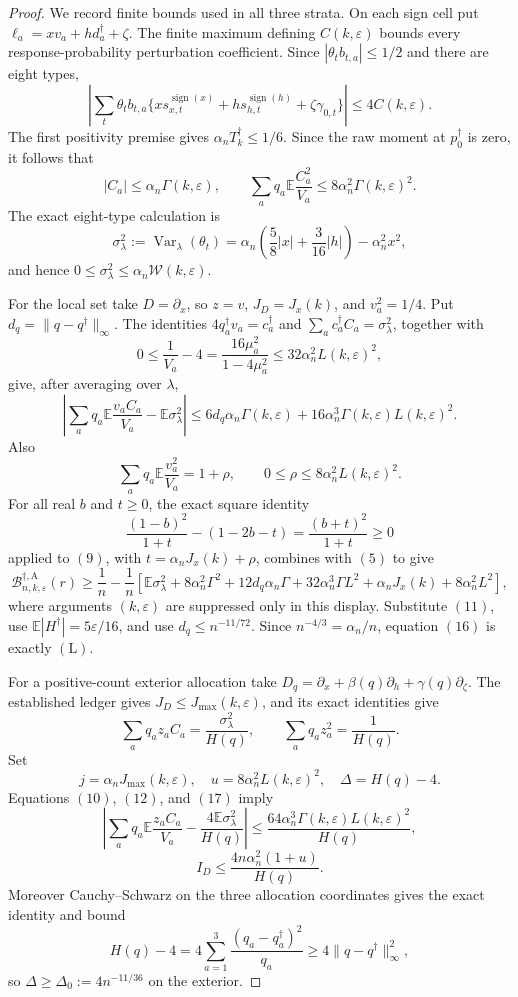 \documentclass{article}
\begin{document}
{\begin{proof}
We record finite bounds used in all three strata.  On each sign cell put
\(\ell_a=xv_a+hd_a^\dagger+\zeta\).  The finite maximum defining
\(C(k,\varepsilon)\) bounds every response-probability perturbation coefficient.  Since \(|\theta_tb_{t,a}|\le1/2\) and there are eight types,
\[
\left|\sum_t\theta_tb_{t,a}
\{xs_{x,t}^{\operatorname{sign}(x)}
+hs_{h,t}^{\operatorname{sign}(h)}+\zeta\gamma_{0,t}\}\right|
\le4C(k,\varepsilon).
\]
The first positivity premise gives \(\alpha_nT_k^\dagger\le1/6\).  Since the raw moment at \(p_0^\dagger\) is zero, it follows that
\[
|C_a|\le\alpha_n\Gamma(k,\varepsilon),
\qquad
\sum_aq_a\mathbb E\frac{C_a^2}{V_a}
\le8\alpha_n^2\Gamma(k,\varepsilon)^2.
\tag{10}
\]
The exact eight-type calculation is
\[
\sigma_\lambda^2:=\operatorname{Var}_\lambda(\theta_t)
=\alpha_n\left(\frac58|x|+\frac3{16}|h|\right)-\alpha_n^2x^2,
\tag{11}
\]
and hence
\(0\le\sigma_\lambda^2\le\alpha_n\mathcal W(k,\varepsilon)\).

For the local set take \(D=\partial_x\), so \(z=v\), \(J_D=J_x(k)\), and \(v_a^2=1/4\).  Put \(d_q=\|q-q^\dagger\|_\infty\).  The identities
\(4q_a^\dagger v_a=c_a^\dagger\) and
\(\sum_ac_a^\dagger C_a=\sigma_\lambda^2\), together with
\[
0\le \frac1{V_a}-4
=\frac{16\mu_a^2}{1-4\mu_a^2}
\le32\alpha_n^2L(k,\varepsilon)^2,
\tag{12}
\]
give, after averaging over \(\lambda\),
\[
\left|\sum_aq_a\mathbb E\frac{v_aC_a}{V_a}
-\mathbb E\sigma_\lambda^2\right|
\le6d_q\alpha_n\Gamma(k,\varepsilon)
+16\alpha_n^3\Gamma(k,\varepsilon)L(k,\varepsilon)^2.
\tag{13}
\]
Also
\[
\sum_aq_a\mathbb E\frac{v_a^2}{V_a}=1+\rho,
\qquad 0\le\rho\le8\alpha_n^2L(k,\varepsilon)^2.
\tag{14}
\]
For all real \(b\) and \(t\ge0\), the exact square identity
\[
\frac{(1-b)^2}{1+t}-(1-2b-t)=\frac{(b+t)^2}{1+t}\ge0
\tag{15}
\]
applied to \((9)\), with
\(t=\alpha_nJ_x(k)+\rho\), combines with \((5)\) to give
\[
\mathcal B_{n,k,\varepsilon}^{\dagger,\mathrm A}(r)
\ge\frac1n-\frac1n\left[
\mathbb E\sigma_\lambda^2+8\alpha_n^2\Gamma^2
+12d_q\alpha_n\Gamma+32\alpha_n^3\Gamma L^2
+\alpha_nJ_x(k)+8\alpha_n^2L^2\right],
\tag{16}
\]
where arguments \((k,\varepsilon)\) are suppressed only in this display.  Substitute \((11)\), use
\(\mathbb E|H^\dagger|=5\varepsilon/16\), and use
\(d_q\le n^{-11/72}\).  Since \(n^{-4/3}=\alpha_n/n\), equation \((16)\) is exactly \((\mathrm L)\).

For a positive-count exterior allocation take
\(D_q=\partial_x+\beta(q)\partial_h+\gamma(q)\partial_\zeta\).
The established ledger gives \(J_D\le J_{\max}(k,\varepsilon)\), and its exact identities give
\[
\sum_aq_az_aC_a=\frac{\sigma_\lambda^2}{H(q)},
\qquad
\sum_aq_az_a^2=\frac1{H(q)}.
\tag{17}
\]
Set
\[
j=\alpha_nJ_{\max}(k,\varepsilon),
\quad u=8\alpha_n^2L(k,\varepsilon)^2,
\quad \Delta=H(q)-4.
\]
Equations \((10)\), \((12)\), and \((17)\) imply
\[
\left|\sum_aq_a\mathbb E\frac{z_aC_a}{V_a}
-\frac{4\mathbb E\sigma_\lambda^2}{H(q)}\right|
\le\frac{64\alpha_n^3\Gamma(k,\varepsilon)L(k,\varepsilon)^2}{H(q)},
\tag{18}
\]
\[
I_D\le\frac{4n\alpha_n^2(1+u)}{H(q)}.
\tag{19}
\]
Moreover Cauchy--Schwarz on the three allocation coordinates gives the exact identity and bound
\[
H(q)-4=4\sum_{a=1}^3\frac{(q_a-q_a^\dagger)^2}{q_a}
\ge4\|q-q^\dagger\|_\infty^2,
\tag{20}
\]
so \(\Delta\ge\Delta_0:=4n^{-11/36}\) on the exterior.


\end{proof}}
\end{document}
